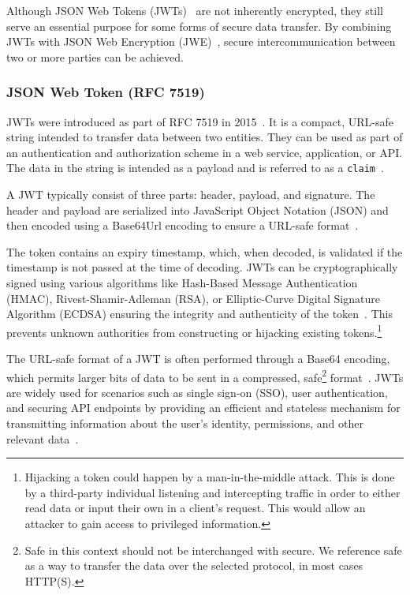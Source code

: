 Although JSON Web Tokens (JWTs)~\cite{RFC7519} are not inherently encrypted,
they still serve an essential purpose for some forms of secure data transfer.
By combining JWTs with JSON Web Encryption (JWE)~\cite{rfc7516}, secure
intercommunication between two or more parties can be achieved.

\subsubsection{JSON Web Token (RFC 7519)}
JWTs were introduced as part of RFC 7519 in 2015~\cite{RFC7519}.
It is a compact, URL-safe string intended to transfer data between two entities.
They can be used as part of an authentication and authorization scheme in a web
service, application, or API\@.
The data in the string is intended as a payload and is referred to as a
\texttt{claim}~\cite{RFC7519}.

A JWT typically consist of three parts: header, payload, and signature.
The header and payload are serialized into JavaScript Object Notation (JSON)
and then encoded using a Base64Url encoding to ensure a URL-safe
format~\cite{RFC7519}.

The token contains an expiry timestamp, which, when decoded, is validated if
the timestamp is not passed at the time of decoding.
JWTs can be cryptographically signed using various algorithms like Hash-Based
Message Authentication (HMAC), Rivest-Shamir-Adleman (RSA), or
Elliptic-Curve Digital Signature Algorithm (ECDSA) ensuring the integrity and
authenticity of the token~\cite{RFC7519}.
This prevents unknown authorities from constructing or hijacking existing
tokens.\footnote{
  Hijacking a token could happen by a man-in-the-middle attack.
  This is done by a third-party individual listening and intercepting traffic
  in order to either read data or input their own in a client's request.
  This would allow an attacker to gain access to privileged information.
}

The URL-safe format of a JWT is often performed through a Base64 encoding, which
permits larger bits of data to be sent in a compressed, safe\footnote{
  Safe in this context should not be interchanged with secure.
  We reference safe as a way to transfer the data over the selected protocol,
  in most cases HTTP(S).
} format~\cite{RFC7519}.
JWTs are widely used for scenarios such as single sign-on (SSO), user
authentication, and securing API endpoints by providing an efficient and
stateless mechanism for transmitting information about the user's identity,
permissions, and other relevant data~\cite{karande2018securingnode}.

